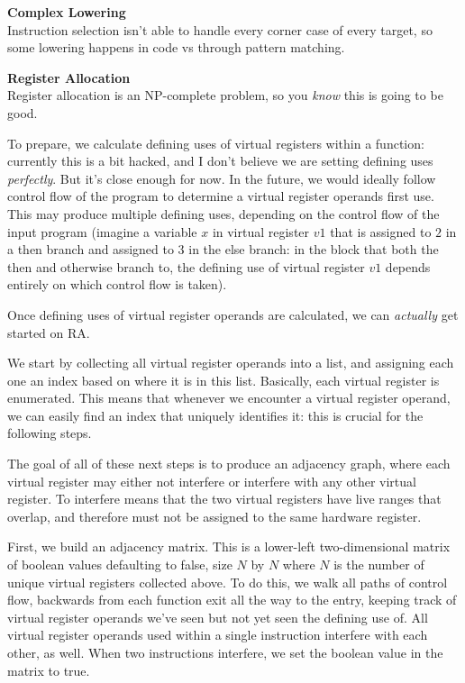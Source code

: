 \documentclass[12pt]{article}
\begin{document}
\noindent\textbf{Complex Lowering}\\
\indent Instruction selection isn't able to handle every corner case of every target, so some lowering happens in code vs through pattern matching.

\noindent\textbf{Register Allocation}\\
\indent Register allocation is an NP-complete problem, so you \emph{know} this is going to be good.

To prepare, we calculate defining uses of virtual registers within a function: currently this is a bit hacked, and I don't believe we are setting defining uses \emph{perfectly}. But it's close enough for now. In the future, we would ideally follow control flow of the program to determine a virtual register operands first use. This may produce multiple defining uses, depending on the control flow of the input program (imagine a variable $x$ in virtual register $v1$ that is assigned to $2$ in a then branch and assigned to $3$ in the else branch: in the block that both the then and otherwise branch to, the defining use of virtual register $v1$ depends entirely on which control flow is taken).

Once defining uses of virtual register operands are calculated, we can \emph{actually} get started on RA.

We start by collecting all virtual register operands into a list, and assigning each one an index based on where it is in this list. Basically, each virtual register is enumerated. This means that whenever we encounter a virtual register operand, we can easily find an index that uniquely identifies it: this is crucial for the following steps.

The goal of all of these next steps is to produce an adjacency graph, where each virtual register may either not interfere or interfere with any other virtual register. To interfere means that the two virtual registers have live ranges that overlap, and therefore must not be assigned to the same hardware register.

First, we build an adjacency matrix. This is a lower-left two-dimensional matrix of boolean values defaulting to false, size $N$ by $N$ where $N$ is the number of unique virtual registers collected above. To do this, we walk all paths of control flow, backwards from each function exit all the way to the entry, keeping track of virtual register operands we've seen but not yet seen the defining use of. All virtual register operands used within a single instruction interfere with each other, as well. When two instructions interfere, we set the boolean value in the matrix to true.
\end{document}
